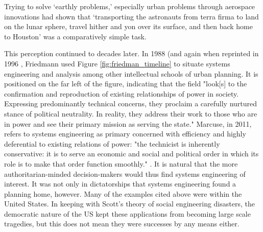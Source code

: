 \vspace{-7mm}

\begin{singlespcquote}
Trying to solve `earthly problems,' especially urban problems through aerospace innovations had shown that `transporting the astronauts from terra firma to land on the lunar sphere, travel hither and yon over its surface, and then back home to Houston' was a comparatively simple task. \cite{lightWarfareWelfareDefense2005}
\end{singlespcquote}

This perception continued to decades later. In 1988 \cite{friedmannPlanningPublicDomain1988} (and again when reprinted in 1996 \cite{mazza2017}, Friedmann used Figure \ref{fig:friedman_timeline} to situate systems engineering and analysis among other intellectual schools of urban planning. It is positioned on the far left of the figure, indicating that the field "look[s] to the confirmation and reproduction of existing relationships of power in society. Expressing predominantly technical concerns, they proclaim a carefully nurtured stance of political neutrality. In reality, they address their work to those who are in power and see their primary mission as serving the state." Marcuse, in 2011, refers to systems engineering as primary concerned with efficiency and highly deferential to existing relations of power: "the technicist is inherently conservative: it is to serve an economic and social and political order in which its role is to make that order function smoothly." \cite{marcuseThreeHistoricCurrents2016}. It is natural that the more authoritarian-minded decision-makers would thus find systems engineering of interest. It was not only in dictatorships that systems engineering found a planning home, however. Many of the examples cited above were within the United States. In keeping with Scott's theory of social engineering disasters, the democratic nature of the US kept these applications from becoming large scale tragedies, but this does not mean they were successes by any means either. 


